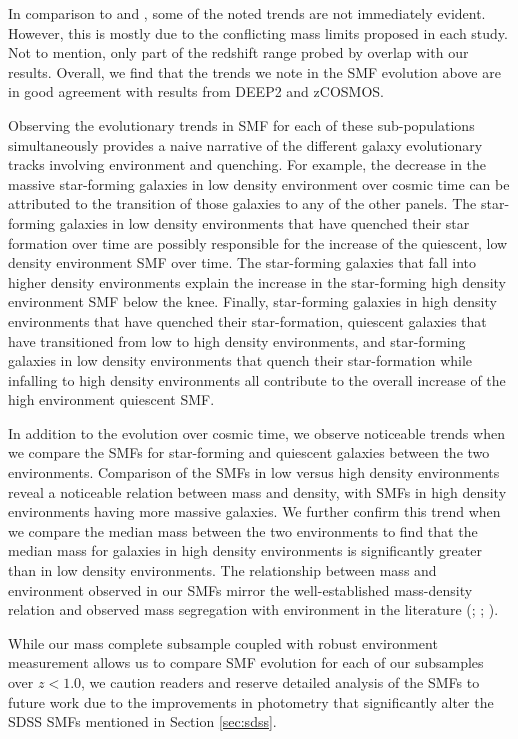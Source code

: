 \documentclass{emulateapj}
\begin{document}
In comparison to \cite{bundy06a} and \cite{Bolzonella:2010aa}, some of the noted trends are not immediately evident. However, this is mostly due to the conflicting mass limits proposed in each study. Not to mention, only part of the redshift range probed by \cite{bundy06a} overlap with our results. Overall, we find that the trends we note in the SMF evolution above are in good agreement with results from DEEP2 and zCOSMOS. 

Observing the evolutionary trends in SMF for each of these sub-populations simultaneously provides a naive narrative of the different galaxy evolutionary tracks involving environment and quenching. For example, the decrease in the massive star-forming galaxies in low density environment over cosmic time can be attributed to the transition of those galaxies to any of the other panels. The star-forming galaxies in low density environments that have quenched their star formation over time are possibly responsible for the increase of the quiescent, low density environment SMF over time. The star-forming galaxies that fall into higher density environments explain the increase in the star-forming high density environment SMF below the knee. Finally, star-forming galaxies in high density environments that have quenched their star-formation, quiescent galaxies that have transitioned from low to high density environments, and star-forming galaxies in low density environments that quench their star-formation while infalling to high density environments all contribute to the overall increase of the high environment quiescent SMF.

In addition to the evolution over cosmic time, we observe noticeable trends when we compare the SMFs for star-forming and quiescent galaxies between the two environments. Comparison of the SMFs in low versus high density environments reveal a noticeable relation between mass and density, with SMFs in high density environments having more massive galaxies. We further confirm this trend when we compare the median mass between the two environments to find that the median mass for galaxies in high density environments is significantly greater than in low density environments. The relationship between mass and environment observed in our SMFs mirror the well-established mass-density relation and observed mass segregation with environment in the literature (\cite{bundy06a}; \cite{Scodeggio:2009aa}; \cite{Bolzonella:2010aa}).

While our mass complete subsample coupled with robust environment measurement allows us to compare SMF evolution for each of our subsamples over $z < 1.0$, we caution readers and reserve detailed analysis of the SMFs to future work due to the improvements in photometry that significantly alter the SDSS SMFs mentioned in Section \ref{sec:sdss}. 
\end{document}
